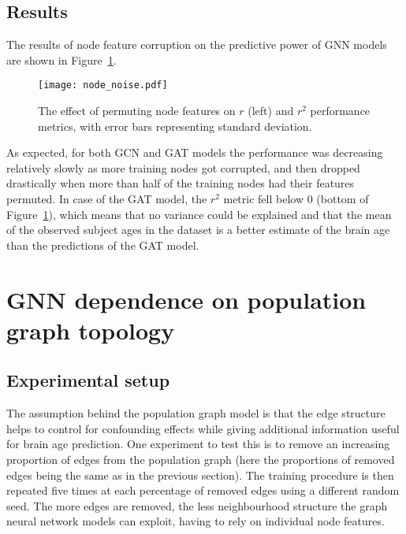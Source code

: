 \subsection{Results}

The results of node feature corruption on the predictive power of GNN models are shown in Figure~\ref{figure:node-noise}.

\begin{figure}[h]
    \centering
    \texttt{[image: node\_noise.pdf]}
    \caption{The effect of permuting node features on $r$ (left) and $r^2$ performance metrics, with error bars representing standard deviation.}\label{figure:node-noise}
\end{figure}

As expected, for both GCN and GAT models the performance was decreasing relatively slowly as more training nodes got corrupted, and then dropped drastically when more than half of the training nodes had their features permuted. In case of the GAT model, the $r^2$ metric fell below 0 (bottom of Figure~\ref{figure:node-noise}), which means that no variance could be explained and that the mean of the observed subject ages in the dataset is a better estimate of the brain age than the predictions of the GAT model. 



\section{GNN dependence on population graph topology}
\subsection{Experimental setup}
The assumption behind the population graph model is that the edge structure helps to control for confounding effects while giving additional information useful for brain age prediction. One experiment to test this is to remove an increasing proportion of edges from the population graph (here the proportions of removed edges being the same as in the previous section). The training procedure is then repeated five times at each percentage of removed edges using a different random seed. The more edges are removed, the less neighbourhood structure the graph neural network models can exploit, having to rely on individual node features. 

